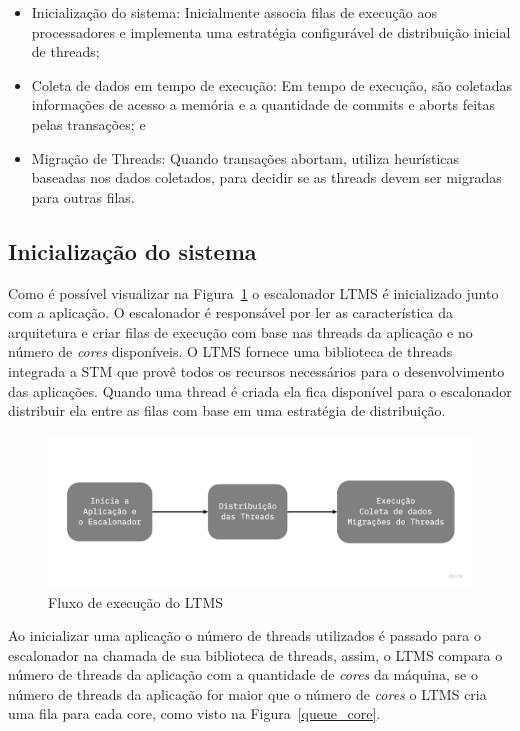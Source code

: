 \documentclass[diss,capa]{texufpel}
\begin{document}
\begin{itemize}
 \item Inicialização do sistema: Inicialmente associa filas de execução aos processadores e implementa uma estratégia configurável de distribuição inicial de threads;
 \item Coleta de dados em tempo de execução: Em tempo de execução, são coletadas informações de acesso a memória e a quantidade de commits e aborts feitas pelas transações; e
 \item Migração de Threads: Quando transações abortam, utiliza heurísticas baseadas nos dados coletados, para decidir se as threads devem ser migradas para outras filas.
\end{itemize}

\subsection{Inicialização do sistema}
\label{inicializacao}

Como é possível visualizar na Figura~\ref{ltms_generic} o escalonador LTMS é inicializado junto com a aplicação. O escalonador é responsável por ler as característica da arquitetura e criar filas de execução com base nas threads da aplicação e no número de \emph{cores} disponíveis. O LTMS fornece uma biblioteca de threads integrada a STM que provê todos os recursos necessários para o desenvolvimento das aplicações. Quando uma thread é criada ela fica disponível para o escalonador distribuir ela entre as filas com base em uma estratégia de distribuição.

\begin{figure}[htbp]
\centering \includegraphics[scale=.25]{images/ltms_generic}
\caption{Fluxo de execução do LTMS}
\label{ltms_generic}
\end{figure}

Ao inicializar uma aplicação o número de threads utilizados é passado para o escalonador na chamada de sua biblioteca de threads, assim, o LTMS compara o número de threads da aplicação com a quantidade de \emph{cores} da máquina, se o número de threads da aplicação for maior que o número de \emph{cores} o LTMS cria uma fila para cada core, como visto na Figura~\ref{queue_core}.
\end{document}
